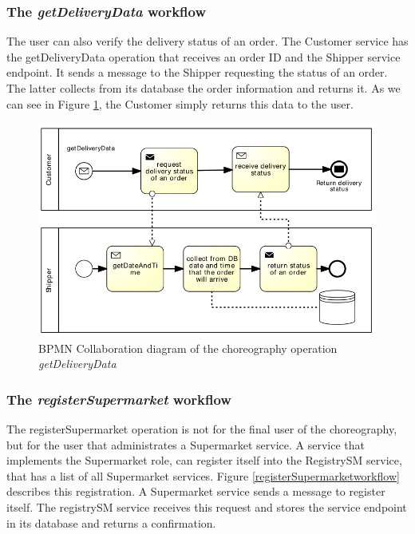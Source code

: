\subsubsection{The \emph{getDeliveryData} workflow}
The user can also verify the delivery status of an order. The Customer service has the getDeliveryData operation that receives an order ID and the Shipper service endpoint. It sends a message to the Shipper requesting the status of an order. The latter collects from its database the order information and returns it. As we can see in Figure \ref{getDeliveryDataworkflow}, the Customer simply returns this data to the user.

\begin{figure}[htbp]
\begin{center}
	\includegraphics{images/getDeliveryDataworkflow}
\caption{BPMN Collaboration diagram of the choreography operation \emph{getDeliveryData}}
\label{getDeliveryDataworkflow}
\end{center}
\end{figure}

\subsubsection{The \emph{registerSupermarket} workflow}
The registerSupermarket operation is not for the final user of the choreography, but for the user that administrates a Supermarket service. A service that implements the Supermarket role, can register itself into the RegistrySM service, that has a list of all Supermarket services. Figure \ref{registerSupermarketworkflow} describes this registration. A Supermarket service sends a message to register itself. The registrySM service receives this request and stores the service endpoint in its database and returns a confirmation.

